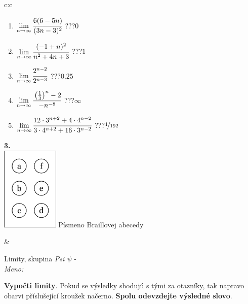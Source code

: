 \documentclass[10pt]{report}
\begin{document}
\begin{tabular}{c:c}
\begin{minipage}[c][104.5mm][t]{0.5\linewidth}
\begin{center}
\begin{minipage}{0.79\linewidth}
\begin{center}
\begin{varwidth}{\linewidth}
\begin{enumerate}
\item $\lim\limits_{n\to\infty}\cfrac{6(6-5n)}{(3n-3)^2}$\quad \dotfill\; ???\;\dotfill \quad $0$
\item $\lim\limits_{n\to\infty}\cfrac{(-1+n)^2}{n^2+4n+3}$\quad \dotfill\; ???\;\dotfill \quad $1$
\item $\lim\limits_{n\to\infty}\cfrac{2^{n-2}}{2^{n-3}}$\quad \dotfill\; ???\;\dotfill \quad $0.25$
\item $\lim\limits_{n\to\infty}\cfrac{\left(\frac{1}{3}\right)^n -2}{-n^{-8}}$\quad \dotfill\; ???\;\dotfill \quad $\infty$
\item $\lim\limits_{n\to\infty}\cfrac{12\cdot 3^{n+2}+4\cdot 4^{n-2}}{3\cdot 4^{n+2}+16\cdot 3^{n-2}}$\quad \dotfill\; ???\;\dotfill \quad $\nicefrac{1}{192}$
\end{enumerate}
\end{varwidth}
\end{center}
\end{minipage}
\begin{minipage}{0.20\linewidth}
\begin{center}
{\Huge\bfseries 3.} \\[2mm]
\includegraphics[height=40mm]{../images/braille.png}
{\small Písmeno Braillovej abecedy}
\end{center}
\end{minipage}
\end{center}
\end{minipage}
&
\begin{minipage}[c][104.5mm][t]{0.5\linewidth}
\begin{center}
\vspace{7mm}
{\huge Limity, skupina \textit{Psi $\psi$} -}\\[5mm]
\textit{Meno:}\phantom{xxxxxxxxxxxxxxxxxxxxxxxxxxxxxxxxxxxxxxxxxxxxxxxxxxxxxxxxxxxxxxxxx}\\[5mm]
\begin{minipage}{0.95\linewidth}
\begin{center}
\textbf{Vypočti limity}. Pokud se výsledky shodujú s tými za otazníky, tak napravo\\obarvi příslušející kroužek načerno. \textbf{Spolu odevzdejte výsledné slovo}.

\end{center}
\end{minipage}
\end{center}
\end{minipage}
\end{tabular}
\end{document}
